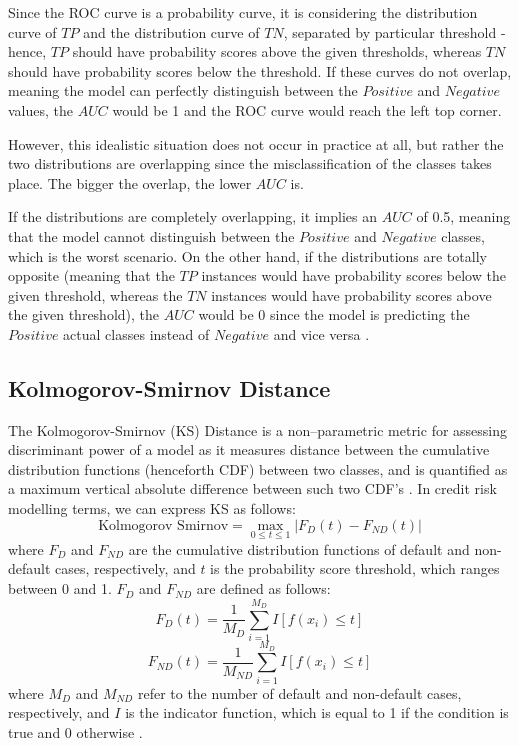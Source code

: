 Since the ROC curve is a probability curve, it is considering the distribution curve of $TP$ and the distribution curve of $TN$, separated by particular threshold - hence, $TP$ should have probability scores above the given thresholds, whereas $TN$ should have probability scores below the threshold.
If these curves do not overlap, meaning the model can perfectly distinguish between the $Positive$ and $Negative$ values, the $AUC$ would be 1 and the ROC curve would reach the left top corner.


However, this idealistic situation does not occur in practice at all, but rather the two distributions are overlapping since the misclassification of the classes takes place.
The bigger the overlap, the lower $AUC$ is.


If the distributions are completely overlapping, it implies an $AUC$ of 0.5, meaning that the model cannot distinguish between the $Positive$ and $Negative$ classes, which is the worst scenario.
On the other hand, if the distributions are totally opposite (meaning that the $TP$ instances would have probability scores below the given threshold, whereas the $TN$ instances would have probability scores above the given threshold), the $AUC$ would be 0 since the model is predicting the $Positive$ actual classes instead of $Negative$ and vice versa \citep{narkhede2018understanding}.



\newpage
\subsection{Kolmogorov-Smirnov Distance}


The Kolmogorov-Smirnov (KS) Distance is a non--parametric metric for assessing discriminant power of a model as it measures distance between the cumulative distribution functions (henceforth CDF) between two classes, and is quantified as a maximum vertical absolute difference between such two CDF's \citep{adeodato2016equivalence}.
In credit risk modelling terms, we can express KS as follows:
\begin{equation}\label{eq}
\text{Kolmogorov Smirnov} = \max_{0 \le t \le 1} \left| F_D \left(t \right) - F_{ND} \left(t \right) \right|
\end{equation}
where $F_D$ and $F_{ND}$ are the cumulative distribution functions of default and non-default cases, respectively, and $t$ is the probability score threshold, which ranges between 0 and 1. $F_D$ and $F_{ND}$ are defined as follows:
\begin{equation}\label{eq}
F_D \left(t \right) = \frac{1}{M_D} \sum_{i=1}^{M_D} I \left[f(x_i) \le t \right]
\end{equation}
\begin{equation}\label{eq}
F_{ND} \left(t \right) = \frac{1}{M_{ND}} \sum_{i=1}^{M_D} I \left[f(x_i) \le t \right]
\end{equation}
where $M_D$ and $M_{ND}$ refer to the number of default and non-default cases, respectively, and $I$ is the indicator function, which is equal to 1 if the condition is true and 0 otherwise \citep{doumpos2019analytical}.


